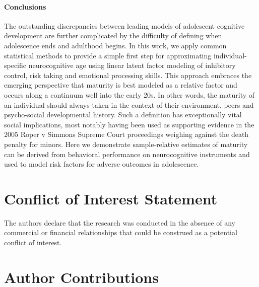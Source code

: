 \documentclass[utf8]{frontiersSCNS} %
\begin{document}
\paragraph*{Conclusions}The outstanding discrepancies between leading models of adolescent cognitive development are further complicated by the difficulty of defining when adolescence ends and adulthood begins. In this work, we apply common statistical methods to provide a simple first step for approximating individual-specific neurocognitive age using linear latent factor modeling of inhibitory control, risk taking and emotional processing skills. This approach embraces the emerging perspective that maturity is best modeled as a relative factor and occurs along a continuum well into the early 20s. In other words, the maturity of an individual should always taken in the context of their environment, peers and psycho-social developmental history. Such a definition has exceptionally vital social implications, most notably having been used as supporting evidence in the 2005 Roper v Simmons Supreme Court proceedings weighing against the death penalty for minors. Here we demonstrate sample-relative estimates of maturity can be derived from behavioral performance on neurocognitive instruments and used to model risk factors for adverse outcomes in adolescence.




\section*{Conflict of Interest Statement}
The authors declare that the research was conducted in the absence of any commercial or financial relationships that could be construed as a potential conflict of interest.

\section*{Author Contributions}
\end{document}

